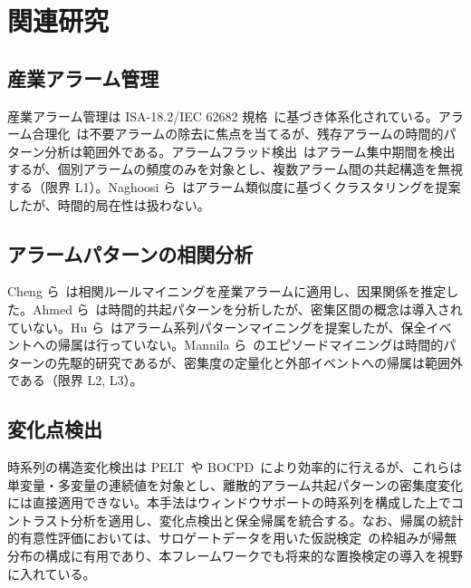\documentclass[11pt]{article}
\begin{document}
\section{関連研究}\label{sec:related}

\subsection{産業アラーム管理}

産業アラーム管理は ISA-18.2/IEC 62682 規格~\citep{isa2009alarm}に基づき体系化されている。アラーム合理化~\citep{bransby1998alarm}は不要アラームの除去に焦点を当てるが、残存アラームの時間的パターン分析は範囲外である。アラームフラッド検出~\citep{izadi2013alarm,wang2016alarm}はアラーム集中期間を検出するが、個別アラームの頻度のみを対象とし、複数アラーム間の共起構造を無視する（限界 L1）。Naghoosi ら~\citep{naghoosi2014alarm}はアラーム類似度に基づくクラスタリングを提案したが、時間的局在性は扱わない。

\subsection{アラームパターンの相関分析}

Cheng ら~\citep{cheng2013alarm}は相関ルールマイニングを産業アラームに適用し、因果関係を推定した。Ahmed ら~\citep{ahmed2013alarm}は時間的共起パターンを分析したが、密集区間の概念は導入されていない。Hu ら~\citep{hu2018alarm}はアラーム系列パターンマイニングを提案したが、保全イベントへの帰属は行っていない。Mannila ら~\citep{mannila1997discovery}のエピソードマイニングは時間的パターンの先駆的研究であるが、密集度の定量化と外部イベントへの帰属は範囲外である（限界 L2, L3）。

\subsection{変化点検出}

時系列の構造変化検出は PELT~\citep{killick2012pelt}や BOCPD~\citep{adams2007bocpd}により効率的に行えるが、これらは単変量・多変量の連続値を対象とし、離散的アラーム共起パターンの密集度変化には直接適用できない。本手法はウィンドウサポートの時系列を構成した上でコントラスト分析を適用し、変化点検出と保全帰属を統合する。なお、帰属の統計的有意性評価においては、サロゲートデータを用いた仮説検定~\citep{lancaster2018surrogate}の枠組みが帰無分布の構成に有用であり、本フレームワークでも将来的な置換検定の導入を視野に入れている。
\end{document}
